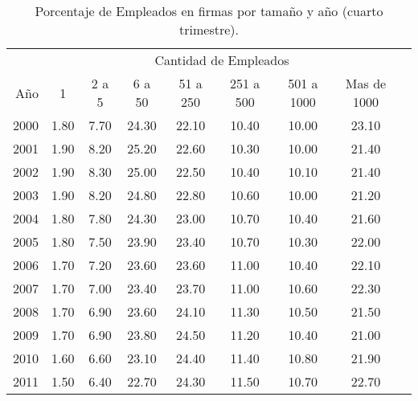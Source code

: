 \begin{table}[H]
\centering
\caption{Porcentaje de Empleados en firmas por tamaño y año (cuarto trimestre).} 
\begin{tabular}{rcccccccc}
  \toprule
  &\multicolumn{7}{c}{Cantidad de Empleados}\\ \cline{2-8}
  A\~no & 1  & 2 a 5  & 6 a 50  & 51 a 250  & 251 a 500  & 501 a 1000  & Mas de 1000  \\ 
  \midrule 2000 & 1.80 & 7.70 & 24.30 & 22.10 & 10.40 & 10.00 & 23.10 \\ 
  2001 & 1.90 & 8.20 & 25.20 & 22.60 & 10.30 & 10.00 & 21.40 \\ 
  2002 & 1.90 & 8.30 & 25.00 & 22.50 & 10.40 & 10.10 & 21.40 \\ 
  2003 & 1.90 & 8.20 & 24.80 & 22.80 & 10.60 & 10.00 & 21.20 \\ 
  2004 & 1.80 & 7.80 & 24.30 & 23.00 & 10.70 & 10.40 & 21.60 \\ 
  2005 & 1.80 & 7.50 & 23.90 & 23.40 & 10.70 & 10.30 & 22.00 \\ 
  2006 & 1.70 & 7.20 & 23.60 & 23.60 & 11.00 & 10.40 & 22.10 \\ 
  2007 & 1.70 & 7.00 & 23.40 & 23.70 & 11.00 & 10.60 & 22.30 \\ 
  2008 & 1.70 & 6.90 & 23.60 & 24.10 & 11.30 & 10.50 & 21.50 \\ 
   2009 & 1.70 & 6.90 & 23.80 & 24.50 & 11.20 & 10.40 & 21.00 \\ 
   2010 & 1.60 & 6.60 & 23.10 & 24.40 & 11.40 & 10.80 & 21.90 \\ 
   2011 & 1.50 & 6.40 & 22.70 & 24.30 & 11.50 & 10.70 & 22.70 \\ 
   \bottomrule
\end{tabular}
\end{table}

